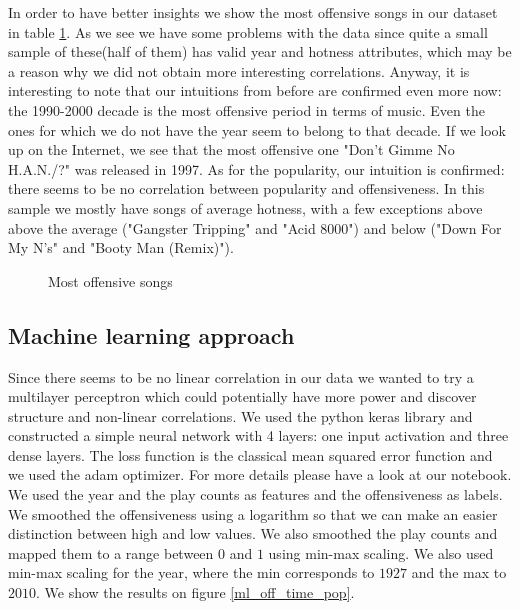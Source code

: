 \documentclass[11pt]{article}
\begin{document}
In order to have better insights we show the most offensive songs in our dataset in table \ref{most_offensive_songs}. As we see we have some problems with the data since quite a small sample of these(half of them) has valid year and hotness attributes, which may be a reason why we did not obtain more interesting correlations. Anyway, it is interesting to note that our intuitions from before are confirmed even more now: the 1990-2000 decade is the most offensive period in terms of music. Even the ones for which we do not have the year seem to belong to that decade. If we look up on the Internet, we see that the most offensive one "Don't Gimme No H.A.N./?" was released in 1997. As for the popularity, our intuition is confirmed: there seems to be no correlation between popularity and offensiveness. In this sample we mostly have songs of average hotness, with a few exceptions above above the average ("Gangster Tripping" and "Acid 8000") and below ("Down For My N's" and "Booty Man (Remix)").

\begin{figure}
\centering

\caption{Most offensive songs}
\label{most_offensive_songs}
\end{figure}

\subsection{Machine learning approach}

Since there seems to be no linear correlation in our data we wanted to try a multilayer perceptron which could potentially have more power and discover structure and non-linear correlations. We used the python keras library and constructed a simple neural network with 4 layers: one input activation and three dense layers. The loss function is the classical mean squared error function and we used the adam optimizer. For more details please have a look at our notebook. We used the year and the play counts as features and the offensiveness as labels. We smoothed the offensiveness using a logarithm so that we can make an easier distinction between high and low values. We also smoothed the play counts and mapped them to a range between $0$ and $1$ using min-max scaling. We also used min-max scaling for the year, where the min corresponds to $1927$ and the max to $2010$. We show the results on figure \ref{ml_off_time_pop}.
\end{document}
